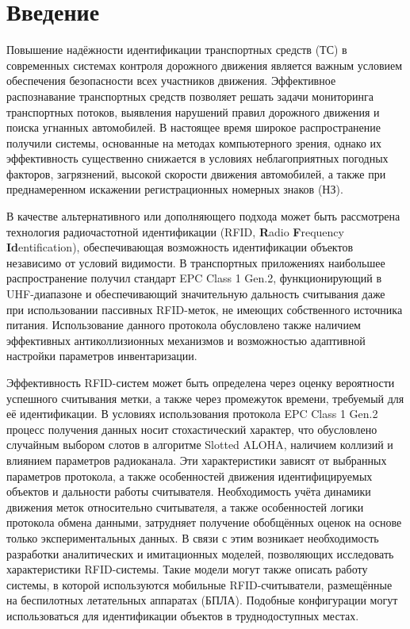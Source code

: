 \documentclass[12pt]{article}
\theoremstyle{definition}
\begin{document}
\setcounter{page}{2}

\tableofcontents
\pagebreak

\section*{Введение}
Повышение надёжности идентификации транспортных средств (ТС) в современных системах контроля дорожного движения является важным условием обеспечения безопасности всех участников движения. Эффективное распознавание транспортных средств позволяет решать задачи мониторинга транспортных потоков, выявления нарушений правил дорожного движения и поиска угнанных автомобилей. В настоящее время широкое распространение получили системы, основанные на методах компьютерного зрения, однако их эффективность существенно снижается в условиях неблагоприятных погодных факторов, загрязнений, высокой скорости движения автомобилей, а также при преднамеренном искажении регистрационных номерных знаков (НЗ).

В качестве альтернативного или дополняющего подхода может быть рассмотрена технология радиочастотной идентификации (RFID, \textbf{R}adio \textbf{F}requency \textbf{Id}entification), обеспечивающая возможность идентификации объектов независимо от условий видимости. В транспортных приложениях наибольшее распространение получил стандарт EPC Class 1 Gen.2, функционирующий в UHF-диапазоне и обеспечивающий значительную дальность считывания даже при использовании пассивных RFID-меток, не имеющих собственного источника питания. Использование данного протокола обусловлено также наличием эффективных антиколлизионных механизмов и возможностью адаптивной настройки параметров инвентаризации.

Эффективность RFID-систем может быть определена через оценку вероятности успешного считывания метки, а также через промежуток времени, требуемый для её идентификации. В условиях использования протокола EPC Class 1 Gen.2 процесс получения данных носит стохастический характер, что обусловлено случайным выбором слотов в алгоритме Slotted ALOHA, наличием коллизий и влиянием параметров радиоканала. Эти характеристики зависят от выбранных параметров протокола, а также особенностей движения идентифицируемых объектов и дальности работы считывателя. Необходимость учёта динамики движения меток относительно считывателя, а также особенностей логики протокола обмена данными, затрудняет получение обобщённых оценок на основе только экспериментальных данных. В связи с этим возникает необходимость разработки аналитических и имитационных моделей, позволяющих исследовать характеристики RFID-системы. Такие модели могут также описать работу системы, в которой используются мобильные RFID-считыватели, размещённые на беспилотных летательных аппаратах (БПЛА). Подобные конфигурации могут использоваться для идентификации объектов в труднодоступных местах.
\end{document}
